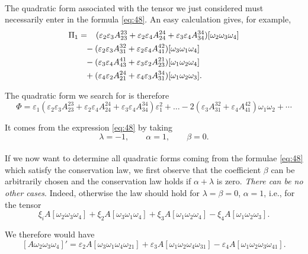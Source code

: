 \documentclass[leqno,12pt]{article}
\makeatletter
\let\old@epsilon\epsilon
\let\old@varepsilon\varepsilon
\let\epsilon\old@varepsilon
\let\varepsilon\old@epsilon
\theoremstyle{shape1}
\theoremstyle{shape0}
\theoremstyle{shape2}
\theoremstyle{definition}
\makeatother
\begin{document}
\paragraph{}
\label{sec:39}
The quadratic form associated with the tensor we just considered must necessarily enter in the formula \eqref{eq:48}. An easy calculation gives, for example,
\begin{align*}
  \Pi_{1}&=\hphantom{+}(\epsilon_{2}\epsilon_{3}A^{23}_{23}+\epsilon_{2}\epsilon_{4}A^{24}_{24}+\epsilon_{3}\epsilon_{4}A^{34}_{34})[\omega_{2}\omega_{3}\omega_{4}]\\
  &\hphantom{=}-(\epsilon_{2}\epsilon_{3}A^{32}_{31}+\epsilon_{2}\epsilon_{4}A^{42}_{41})[\omega_{3}\omega_{1}\omega_{4}]\\
  &\hphantom{=}-(\epsilon_{3}\epsilon_{4}A^{41}_{43}+\epsilon_{3}\epsilon_{2}A^{21}_{23})[\omega_{1}\omega_{2}\omega_{4}]\\
  &\hphantom{=}+(\epsilon_{4}\epsilon_{2}A^{24}_{21}+\epsilon_{4}\epsilon_{3}A^{34}_{31})[\omega_{1}\omega_{2}\omega_{3}].
\end{align*}

The quadratic form we search for is therefore
\[
\Phi=\epsilon_{1}(\epsilon_{2}\epsilon_{3}A^{23}_{23}+\epsilon_{2}\epsilon_{4}A^{24}_{24}+\epsilon_{3}\epsilon_{4}A^{34}_{34})\epsilon^{2}_{1}+\dots-2(\epsilon_{3}A^{32}_{31}+\epsilon_{4}A^{42}_{41})\omega_{1}\omega_{2}+\cdots
\]

It comes from the expression \eqref{eq:48} by taking 
\[
\lambda=-1,\qquad\alpha=1,\qquad\beta=0.
\]

\paragraph{}
\label{sec:40}
If we now want to determine all quadratic forms coming from the formulae \eqref{eq:48} which satisfy the conservation law, we first observe that the coefficient $\beta$ can be arbitrarily chosen and the conservation law holds if $\alpha+\lambda$ is zero. \emph{There can be no other cases}. Indeed, otherwise the law should hold for $\lambda=\beta=0$, $\alpha=1$, i.e., for the tensor
\[
\xi_{i}A[\omega_{2}\omega_{3}\omega_{4}]+\xi_{2}A[\omega_{3}\omega_{1}\omega_{4}]+\xi_{3}A[\omega_{1}\omega_{2}\omega_{4}]-\xi_{4}A[\omega_{1}\omega_{2}\omega_{3}].
\]

We therefore would have
\[
[A\omega_{2}\omega_{3}\omega_{4}]'=\epsilon_{2}A[\omega_{3}\omega_{1}\omega_{4}\omega_{21}]+\epsilon_{3}A[\omega_{1}\omega_{2}\omega_{4}\omega_{31}]-\epsilon_{4}A[\omega_{1}\omega_{2}\omega_{3}\omega_{41}].
\]
\end{document}
